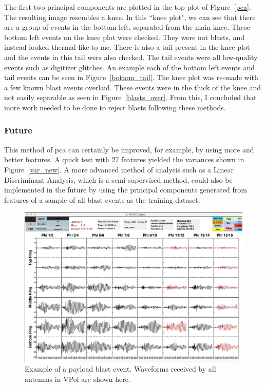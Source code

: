 The first two principal components are plotted in the top plot of Figure~\ref{pca}. The resulting image resembles a knee. In this ``knee plot", we can see that there are a group of events in the bottom left, separated from the main knee. These bottom left events on the knee plot were checked. They were not blasts, and instead looked thermal-like to me. There is also a tail present in the knee plot and the events in this tail were also checked. The tail events were all low-quality events such as digitizer glitches. An example each of the bottom left events and tail events can be seen in Figure~\ref{bottom_tail}.
The knee plot was re-made with a few known blast events overlaid. These events were in the thick of the knee and not easily separable as seen in Figure~\ref{blasts_over}. From this, I concluded that more work needed to be done to reject blasts following these methods.

\subsubsection{Future}

This method of \gls{pca} can certainly be improved, for example, by using more and better features. A quick test with 27 features yielded the variances shown in Figure~\ref{var_new}. A more advanced method of analysis such as a Linear Discriminant Analysis, which is a semi-supervised method, could also be implemented in the future by using the principal components generated from features of a sample of all blast events as the training dataset. 

\begin{figure}
\centering
\includegraphics[width=1.0\textwidth]{figures/77213197.png}
\caption{Example of a payload blast event. Waveforms received by all antennas in VPol are shown here.}
\label{blast}
\end{figure}

